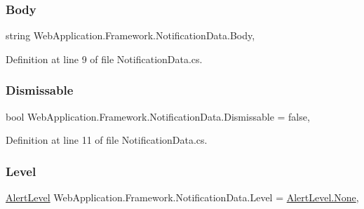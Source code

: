 \subsubsection{\texorpdfstring{Body}{Body}}
{\footnotesize\ttfamily string Web\+Application.\+Framework.\+Notification\+Data.\+Body\hspace{0.3cm}{\ttfamily [get]}, {\ttfamily [set]}}



Definition at line 9 of file Notification\+Data.\+cs.

\mbox{\label{classWebApplication_1_1Framework_1_1NotificationData_a409f1263421e05266791f0021aeae189}} 
\subsubsection{\texorpdfstring{Dismissable}{Dismissable}}
{\footnotesize\ttfamily bool Web\+Application.\+Framework.\+Notification\+Data.\+Dismissable = false\hspace{0.3cm}{\ttfamily [get]}, {\ttfamily [set]}}



Definition at line 11 of file Notification\+Data.\+cs.

\mbox{\label{classWebApplication_1_1Framework_1_1NotificationData_ac1591decc21761f82c8d173e516edd46}} 
\subsubsection{\texorpdfstring{Level}{Level}}
{\footnotesize\ttfamily \mbox{\hyperlink{classWebApplication_1_1Framework_1_1AlertLevel}{Alert\+Level}} Web\+Application.\+Framework.\+Notification\+Data.\+Level = \mbox{\hyperlink{classWebApplication_1_1Framework_1_1AlertLevel_ae3fedb6b350a354a160e3da9b32f3d2a}{Alert\+Level.\+None}}\hspace{0.3cm}{\ttfamily [get]}, {\ttfamily [set]}}



